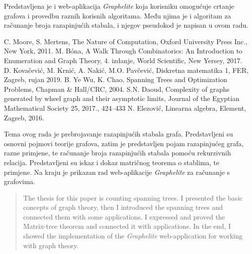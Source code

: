 \documentclass[times, utf8, zavrsni]{fer}
\begin{document}
Predstavljena je i web-aplikacija \textit{Graphelite} koja korisniku omogućuje crtanje grafova i provedbu raznih korisnih algoritama. Među njima je i algoritam za računanje broja razapinjućih stabala, i njegov pseudokod je napisan u ovom radu.



\begin{thebibliography}{6}
	C. Moore, S. Mertens, The Nature of Computation, Oxford University Press Inc., New York, 2011.
	M. Bóna, A Walk Through Combinatorics: An Introduction to Enumeration and Graph Theory, 4. izdanje, World Scientific, New Yersey, 2017.
	D. Kovačević, M. Krnić, A. Nakić, M.O. Pavčević, Diskretna matematika 1, FER, Zagreb, rujan 2019.
	B. Ye Wu, K. Chao, Spanning Trees and Optimization Problems, Chapman \& Hall/CRC, 2004.
	S.N. Daoud, Complexity of graphs generated by wheel graph and their asymptotic limits, Journal of the Egyptian Mathematical Society 25, 2017., 424--433
	N. Elezović, Linearna algebra, Element, Zagreb, 2016.
\end{thebibliography}

\begin{sazetak}
Tema ovog rada je prebrojavanje razapinjućih stabala grafa. Predstavljeni su osnovni pojmovi teorije grafova, zatim je predstavljen pojam razapinjućeg grafa, razne primjene, te računanje broja razapinjućih stabala pomoću rekurzivnih relacija. Predstavljeni su iskaz i dokaz matričnog teorema o stablima, te primjene. Na kraju je prikazan rad web-aplikacije \textit{Graphelite} za računanje s grafovima.

\end{sazetak}

\begin{abstract}
The thesis for this paper is counting spanning trees. I presented the basic concepts of graph theory, then I introduced the spanning trees and connected them with some applications. I expressed and proved the Matrix-tree theorem and connected it with applications. In the end, I showed the implementation of the \textit{Graphelite} web-application for working with graph theory.

\end{abstract}
\end{document}
